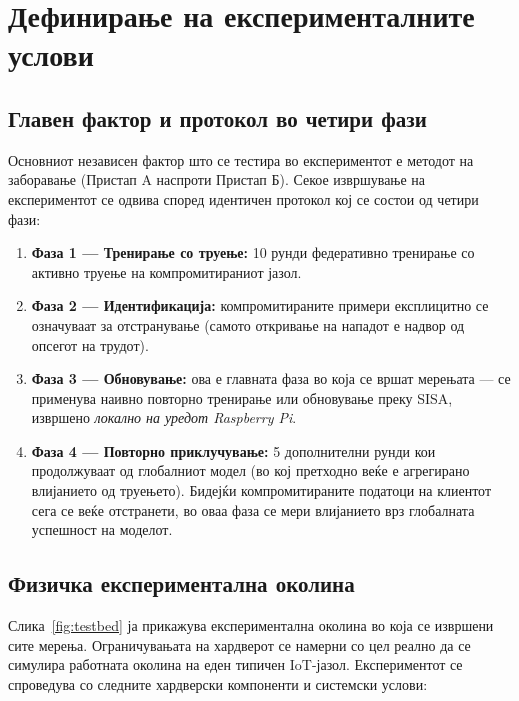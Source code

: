 \section{Дефинирање на експерименталните услови}
\label{sec:exp_conditions}

\subsection{Главен фактор и протокол во четири фази}

Основниот независен фактор што се тестира во експериментот е методот на заборавање (Пристап A наспроти Пристап Б). Секое извршување на експериментот се одвива според идентичен протокол кој се состои од четири фази:

\begin{enumerate}
  \item \textbf{Фаза 1 --- Тренирање со труење:} 10 рунди федеративно тренирање со активно труење на компромитираниот јазол.
  \item \textbf{Фаза 2 --- Идентификација:} компромитираните примери експлицитно се означуваат за отстранување (самото откривање на нападот е надвор од опсегот на трудот).
  \item \textbf{Фаза 3 --- Обновување:} ова е главната фаза во која се вршат мерењата --- се применува наивно повторно тренирање или обновување преку SISA, извршено \emph{локално на уредот Raspberry Pi}.
  \item \textbf{Фаза 4 --- Повторно приклучување:} 5 дополнителни рунди кои продолжуваат од глобалниот модел (во кој претходно веќе е агрегирано влијанието од труењето). Бидејќи компромитираните податоци на клиентот сега се веќе отстранети, во оваа фаза се мери влијанието врз глобалната успешност на моделот.
\end{enumerate}

\subsection{Физичка експериментална околина}
\label{subsec:testbed}

Слика~\ref{fig:testbed} ја прикажува експериментална околина во која се извршени сите мерења. Ограничувањата на хардверот се намерни со цел реално да се симулира работната околина на еден типичен IoT-јазол. Експериментот се спроведува со следните хардверски компоненти и системски услови:

